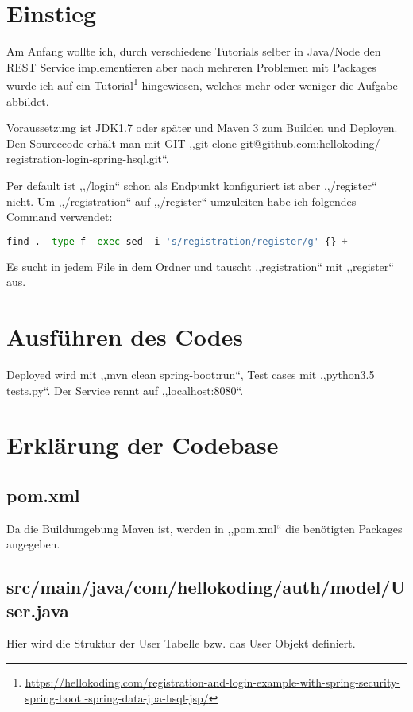 \section{Einstieg}
Am Anfang wollte ich, durch verschiedene Tutorials selber in Java/Node den REST
 Service implementieren aber nach mehreren Problemen mit Packages wurde ich auf
 ein Tutorial\footnote{\href{https://hellokoding.com/registration-and-login-example-with-spring-security-spring-boot-spring-data-jpa-hsql-jsp/}{https://hellokoding.com/registration-and-login-example-with-spring-security-spring-boot
-spring-data-jpa-hsql-jsp/}} hingewiesen, welches mehr oder weniger die Aufgabe
 abbildet.

Voraussetzung ist JDK1.7 oder später und Maven 3 zum Builden und Deployen.
Den Sourcecode erhält man mit GIT ,,git clone git@github.com:hellokoding/
registration-login-spring-hsql.git``. 

Per default ist ,,/login`` schon als Endpunkt konfiguriert ist aber ,,/register``
 nicht. Um ,,/registration`` auf ,,/register`` umzuleiten habe ich folgendes
 Command verwendet:
\begin{lstlisting}[language=Python]
	find . -type f -exec sed -i 's/registration/register/g' {} +
\end{lstlisting}
Es sucht in jedem File in dem Ordner und tauscht ,,registration`` mit
 ,,register`` aus.
 
\section{Ausf\"uhren des Codes}
Deployed wird mit ,,mvn clean spring-boot:run``, Test cases mit ,,python3.5 tests.py``. Der Service rennt auf ,,localhost:8080``.
 
\section{Erkl\"arung der Codebase}
\subsection{pom.xml}
Da die Buildumgebung Maven ist, werden in ,,pom.xml`` die benötigten Packages angegeben.

\subsection{src/main/java/com/hellokoding/auth/model/User.java}
Hier wird die Struktur der User Tabelle bzw. das User Objekt definiert.

